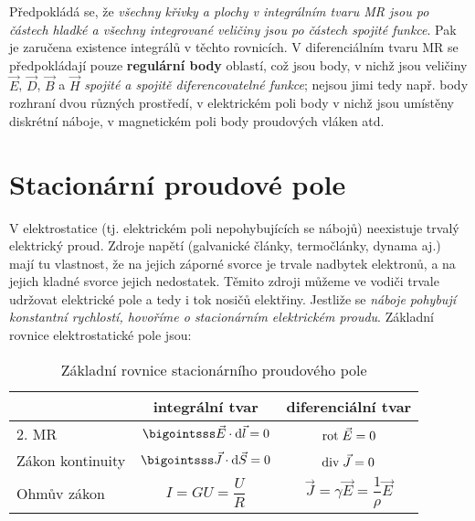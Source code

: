       Předpokládá se, že \emph{všechny křivky a plochy v integrálním tvaru MR jsou po částech
      hladké a všechny integrované veličiny jsou po částech spojité funkce}. Pak je zaručena
      existence integrálů v těchto rovnicích. V diferenciálním tvaru MR se předpokládají pouze
      \textbf{regulární body} oblastí, což jsou body, v nichž jsou veličiny $\vec{E}$, $\vec{D}$,
      $\vec{B}$ a $\vec{H}$ \emph{spojité a spojitě diferencovatelné funkce}; nejsou jimi tedy např.
      body rozhraní dvou různých prostředí, v elektrickém poli body v nichž jsou umístěny diskrétní
      náboje, v magnetickém poli body proudových vláken atd.

        
      
  \section{Stacionární proudové pole}
    V elektrostatice (tj. elektrickém poli nepohybujících se nábojů) neexistuje trvalý elektrický
    proud. Zdroje napětí (galvanické články, termočlánky, dynama aj.) mají tu vlastnost, že na
    jejich záporné svorce je trvale nadbytek elektronů, a na jejich kladné svorce jejich
    nedostatek. Těmito zdroji můžeme ve vodiči trvale udržovat elektrické pole a tedy i tok nosičů
    elektřiny. Jestliže se \emph{náboje pohybují konstantní rychlostí, hovoříme o stacionárním
    elektrickém proudu}. Základní rovnice elektrostatické pole jsou:

    \begin{table}[ht!]
      \setlength\extrarowheight{5pt}
      \centering
      \begin{tabular}{lc|c|}
        \cline{2-3}
        \multicolumn{1}{l|}{} 
          & \textbf{integrální tvar} & \textbf{diferenciální tvar}                       \\[8pt]
        \hline
        \multicolumn{1}{|l|}{2. MR} 
          & \(\bigointsss\vec{E}\cdot \dd{\vec{l}} = 0\) & \(\mathrm{rot}\;\vec{E} = 0\)               \\[8pt] 
        \cline{1-3}
        \hline
        \multicolumn{1}{|l|}{Zákon kontinuity} 
          & \(\bigointsss\vec{J}\cdot \dd{\vec{S}}=0\) & \(\mathrm{div}\;\vec{J}=0\)                 \\[8pt]
        \cline{1-3}
        \multicolumn{1}{|l|}{Ohmův zákon}
          & \(I=GU=\dfrac{U}{R}\) & \(\vec{J} = \gamma\vec{E} = \dfrac{1}{\rho}\vec{E}\) \\[8pt]
        \cline{1-3}
      \end{tabular}
      \caption{Základní rovnice stacionárního proudového pole}
    \end{table}
    
